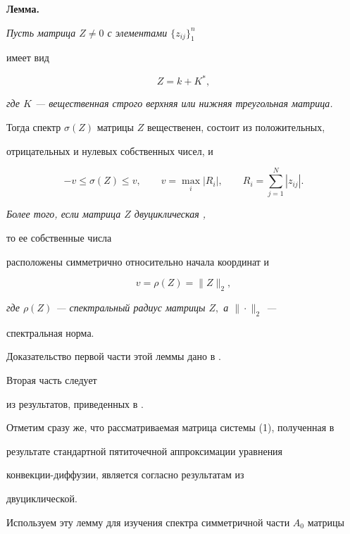 {\bf Лемма.} {\it Пусть матрица $Z\ne 0$ с элементами $\{z_{ij}\}^n_1$


имеет вид}


$$ 


Z=k+K^*, 


$$ 


{\it где $K$ --- вещественная строго верхняя или нижняя треугольная матрица.


Тогда спектр $\sigma(Z)$ матрицы $Z$ вещественен, состоит из положительных, 


отрицательных и нулевых собственных чисел, и}


$$ 


-v \le \sigma(Z) \le v,\qquad v=\max_i|R_i|, \qquad 


R_i=\sum^N_{j=1}|z_{ij}|. 


$$ 


 


{\it Более того, если матрица $Z$ двуциклическая \cite{Gul}, 


то ее собственные числа 


расположены симметрично относительно начала координат и}


$$ 


v=\rho(Z)=\|Z\|_2, 


$$ 


{\it где $\rho(Z)$ --- спектральный радиус матрицы $Z,$ а $\|\cdot\|_2$ --- 


спектральная норма.}


\pagebreak%





Доказательство первой части этой леммы дано в \cite{Kru3}. 


Вторая часть следует 


из результатов, приведенных в \cite{Ha}. 


 


Отметим сразу же, что рассматриваемая матрица системы (1), полученная в 


результате стандартной пятиточечной аппроксимации уравнения 


конвекции-диффузии, является согласно результатам из \cite{Ha} 


двуциклической. 


 


Используем эту лемму для изучения спектра симметричной части $A_0$ матрицы 


